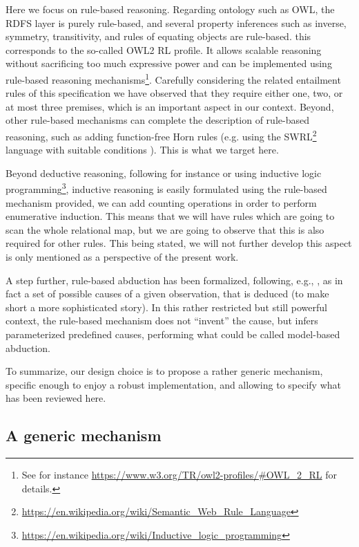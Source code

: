 \documentclass[sn-mathphys]{sn-jnl}
\newcommand{\hhref}[1]{\href{#1}{#1}}
\begin{document}
Here we focus on rule-based reasoning. Regarding ontology such as OWL, the RDFS layer is purely rule-based, and several property inferences such as inverse, symmetry, transitivity, and rules of equating objects are rule-based. this corresponds to the so-called OWL2 RL profile. It allows scalable reasoning without sacrificing too much expressive power and can be implemented using rule-based reasoning mechanisms\footnote{See for instance \hhref{https://www.w3.org/TR/owl2-profiles/\#OWL_2_RL} for details.}. Carefully considering the related entailment rules of this specification we have observed that they require either one, two, or at most three premises, which is an important aspect in our context. Beyond, other rule-based mechanisms can complete the description of rule-based reasoning, such as adding function-free Horn rules (e.g. using the SWRL\footnote{\hhref{https://en.wikipedia.org/wiki/Semantic_Web_Rule_Language}} language with suitable conditions \cite{motik_query_2005}). This is what we target here.

Beyond deductive reasoning, following \cite{domingos_unifying_1996} for instance or using inductive logic programming\footnote{\hhref{https://en.wikipedia.org/wiki/Inductive_logic_programming}}, inductive reasoning is easily formulated using the rule-based mechanism provided, we can add counting operations in order to perform enumerative induction. This means that we will have rules which are going to scan the whole relational map, but we are going to observe that this is also required for other rules. This being stated, we will not further develop this aspect is only mentioned as a perspective of the present work.

A step further, rule-based abduction has been formalized, following, e.g., \cite{lakkaraju_rule_2000}, as in fact a set of possible causes of a given observation, that is deduced (to make short a more sophisticated story). In this rather restricted but still powerful context, the rule-based mechanism does not ``invent'' the cause, but infers parameterized predefined causes, performing what could be called model-based abduction.

To summarize, our design choice is to propose a rather generic mechanism, specific enough to enjoy a robust implementation, and allowing to specify what has been reviewed here.

\subsection{A generic mechanism}
\end{document}
